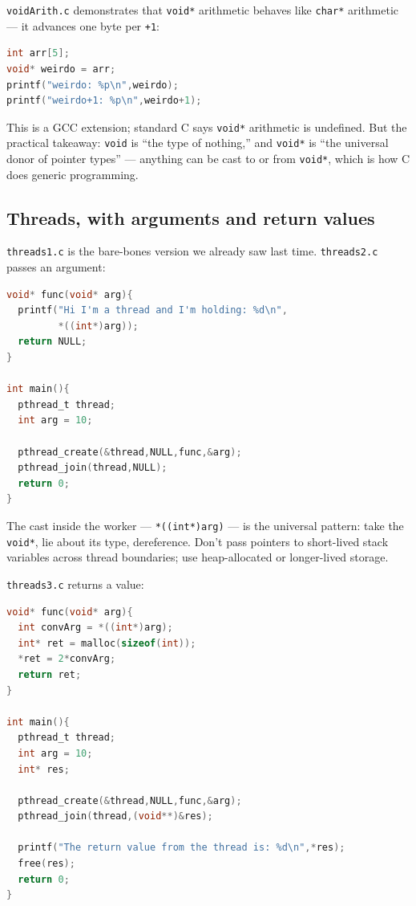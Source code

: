 \documentclass[11pt]{article}
\begin{document}
\texttt{voidArith.c} demonstrates that \texttt{void*} arithmetic
behaves like \texttt{char*} arithmetic --- it advances one byte per
\texttt{+1}:

\begin{lstlisting}[language=C]
int arr[5];
void* weirdo = arr;
printf("weirdo: %p\n",weirdo);
printf("weirdo+1: %p\n",weirdo+1);
\end{lstlisting}

This is a GCC extension; standard C says \texttt{void*} arithmetic
is undefined. But the practical takeaway: \texttt{void} is ``the
type of nothing,'' and \texttt{void*} is ``the universal donor of
pointer types'' --- anything can be cast to or from \texttt{void*},
which is how C does generic programming.

\subsection*{Threads, with arguments and return values}

\texttt{threads1.c} is the bare-bones version we already saw last
time. \texttt{threads2.c} passes an argument:

\begin{lstlisting}[language=C]
void* func(void* arg){
  printf("Hi I'm a thread and I'm holding: %d\n",
         *((int*)arg));
  return NULL;
}

int main(){
  pthread_t thread;
  int arg = 10;

  pthread_create(&thread,NULL,func,&arg);
  pthread_join(thread,NULL);
  return 0;
}
\end{lstlisting}

The cast inside the worker --- \texttt{*((int*)arg)} --- is the
universal pattern: take the \texttt{void*}, lie about its type,
dereference. Don't pass pointers to short-lived stack variables
across thread boundaries; use heap-allocated or longer-lived
storage.

\texttt{threads3.c} returns a value:

\begin{lstlisting}[language=C]
void* func(void* arg){
  int convArg = *((int*)arg);
  int* ret = malloc(sizeof(int));
  *ret = 2*convArg;
  return ret;
}

int main(){
  pthread_t thread;
  int arg = 10;
  int* res;

  pthread_create(&thread,NULL,func,&arg);
  pthread_join(thread,(void**)&res);

  printf("The return value from the thread is: %d\n",*res);
  free(res);
  return 0;
}
\end{lstlisting}
\end{document}
